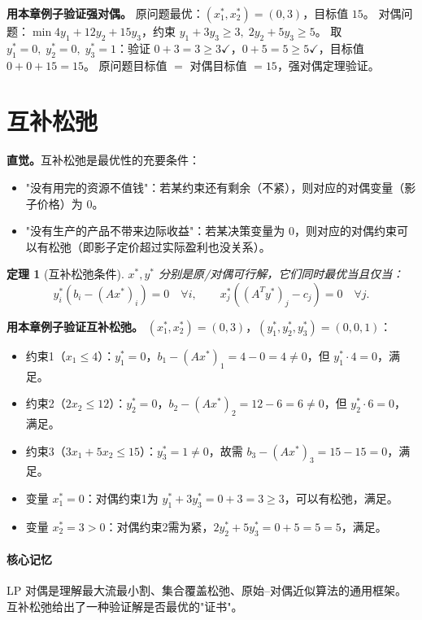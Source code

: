 \documentclass[UTF8,openany,12pt]{ctexbook}
\newtheorem{theorem}{定理}[chapter]
\theoremstyle{remark}
\newcommand{\keypoint}[1]{\paragraph{核心记忆}#1}
\begin{document}
\noindent\textbf{用本章例子验证强对偶。}
原问题最优：$(x_1^*,x_2^*)=(0,3)$，目标值 $15$。
对偶问题：$\min 4y_1+12y_2+15y_3$，约束 $y_1+3y_3\ge3,\;2y_2+5y_3\ge5$。
取 $y_1^*=0,\;y_2^*=0,\;y_3^*=1$：验证 $0+3=3\ge3\checkmark$，$0+5=5\ge5\checkmark$，目标值 $0+0+15=15$。
原问题目标值 $=$ 对偶目标值 $=15$，强对偶定理验证。

\section{互补松弛}

\noindent\textbf{直觉。}互补松弛是最优性的充要条件：
\begin{itemize}
  \item "没有用完的资源不值钱"：若某约束还有剩余（不紧），则对应的对偶变量（影子价格）为 $0$。
  \item "没有生产的产品不带来边际收益"：若某决策变量为 $0$，则对应的对偶约束可以有松弛（即影子定价超过实际盈利也没关系）。
\end{itemize}

\begin{theorem}[互补松弛条件]
$x^*,y^*$ 分别是原/对偶可行解，它们同时最优当且仅当：
\[
  y_i^*(b_i-(Ax^*)_i)=0\quad\forall i,\qquad x_j^*((A^Ty^*)_j-c_j)=0\quad\forall j.
\]
\end{theorem}

\noindent\textbf{用本章例子验证互补松弛。}
$(x_1^*,x_2^*)=(0,3)$，$(y_1^*,y_2^*,y_3^*)=(0,0,1)$：
\begin{itemize}
  \item 约束1（$x_1\le4$）：$y_1^*=0$，$b_1-(Ax^*)_1=4-0=4\ne0$，但 $y_1^*\cdot4=0$，满足。
  \item 约束2（$2x_2\le12$）：$y_2^*=0$，$b_2-(Ax^*)_2=12-6=6\ne0$，但 $y_2^*\cdot6=0$，满足。
  \item 约束3（$3x_1+5x_2\le15$）：$y_3^*=1\ne0$，故需 $b_3-(Ax^*)_3=15-15=0$，满足。
  \item 变量 $x_1^*=0$：对偶约束1为 $y_1^*+3y_3^*=0+3=3\ge3$，可以有松弛，满足。
  \item 变量 $x_2^*=3>0$：对偶约束2需为紧，$2y_2^*+5y_3^*=0+5=5=5$，满足。
\end{itemize}

\keypoint{LP 对偶是理解最大流最小割、集合覆盖松弛、原始--对偶近似算法的通用框架。互补松弛给出了一种验证解是否最优的"证书"。}

\end{document}
